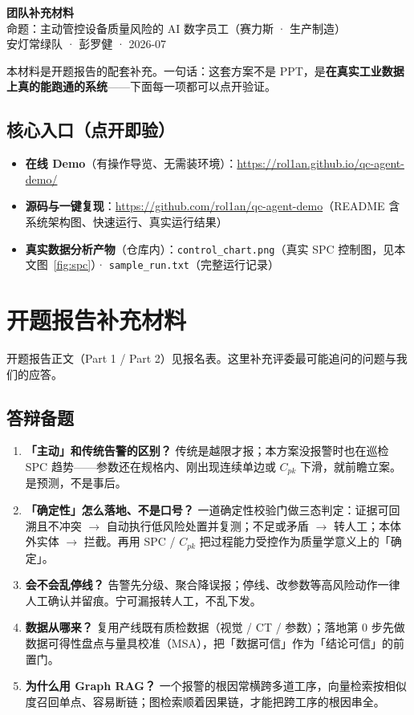 \documentclass[a4paper, 11pt, fontset=fandol]{ctexart}
\begin{document}
\begin{center}
  {\LARGE\bfseries 团队补充材料}\\[6pt]
  {\large 命题：主动管控设备质量风险的 AI 数字员工（赛力斯 · 生产制造）}\\[8pt]
  {\color{soft}安灯常绿队 · 彭罗健 · 2026-07}
\end{center}

\vspace{4pt}
\noindent
本材料是开题报告的配套补充。一句话：这套方案不是 PPT，是\textbf{在真实工业数据上真的能跑通的系统}——下面每一项都可以点开验证。

\subsection*{核心入口（点开即验）}

\begin{itemize}
  \item \textbf{在线 Demo}（有操作导览、无需装环境）：\url{https://rol1an.github.io/qc-agent-demo/}
  \item \textbf{源码与一键复现}：\url{https://github.com/rol1an/qc-agent-demo}（README 含系统架构图、快速运行、真实运行结果）
  \item \textbf{真实数据分析产物}（仓库内）：\texttt{control\_chart.png}（真实 SPC 控制图，见本文图~\ref{fig:spc}）· \texttt{sample\_run.txt}（完整运行记录）
\end{itemize}

\section{开题报告补充材料}

开题报告正文（Part 1 / Part 2）见报名表。这里补充评委最可能追问的问题与我们的应答。

\subsection*{答辩备题}

\begin{enumerate}
  \item \textbf{「主动」和传统告警的区别？} 传统是越限才报；本方案没报警时也在巡检 SPC 趋势——参数还在规格内、刚出现连续单边或 $C_{pk}$ 下滑，就前瞻立案。是预测，不是事后。
  \item \textbf{「确定性」怎么落地、不是口号？} 一道确定性校验门做三态判定：证据可回溯且不冲突 $\to$ 自动执行低风险处置并复测；不足或矛盾 $\to$ 转人工；本体外实体 $\to$ 拦截。再用 SPC / $C_{pk}$ 把过程能力受控作为质量学意义上的「确定」。
  \item \textbf{会不会乱停线？} 告警先分级、聚合降误报；停线、改参数等高风险动作一律人工确认并留痕。宁可漏报转人工，不乱下发。
  \item \textbf{数据从哪来？} 复用产线既有质检数据（视觉 / CT / 参数）；落地第 0 步先做数据可得性盘点与量具校准（MSA），把「数据可信」作为「结论可信」的前置门。
  \item \textbf{为什么用 Graph RAG？} 一个报警的根因常横跨多道工序，向量检索按相似度召回单点、容易断链；图检索顺着因果链，才能把跨工序的根因串全。
\end{enumerate}
\end{document}
